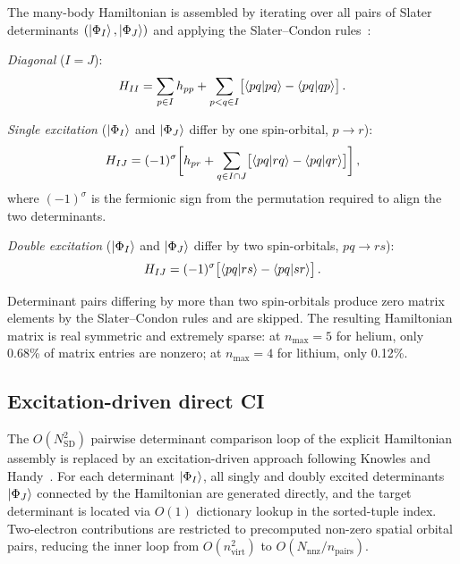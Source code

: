 \documentclass[aps,pra,twocolumn,superscriptaddress,longbibliography,floatfix]{revtex4-2}
\begin{document}
The many-body Hamiltonian is assembled by iterating over all pairs
of Slater determinants $(\ket{\Phi_I}, \ket{\Phi_J})$ and applying
the Slater--Condon rules~\cite{Szabo1996}:

\emph{Diagonal} ($I = J$):
\begin{equation}
H_{II} = \sum_{p \in I} h_{pp}
+ \sum_{p < q \in I} \bigl[\braket{pq|pq} - \braket{pq|qp}\bigr]\,.
\label{eq:sc_diag}
\end{equation}

\emph{Single excitation} ($\ket{\Phi_I}$ and $\ket{\Phi_J}$ differ
by one spin-orbital, $p \to r$):
\begin{equation}
H_{IJ} = (-1)^{\sigma} \biggl[ h_{pr}
+ \sum_{q \in I \cap J} \bigl[\braket{pq|rq} - \braket{pq|qr}\bigr]
\biggr]\,,
\label{eq:sc_single}
\end{equation}
where $(-1)^{\sigma}$ is the fermionic sign from the permutation
required to align the two determinants.

\emph{Double excitation} ($\ket{\Phi_I}$ and $\ket{\Phi_J}$ differ
by two spin-orbitals, $pq \to rs$):
\begin{equation}
H_{IJ} = (-1)^{\sigma}
\bigl[\braket{pq|rs} - \braket{pq|sr}\bigr]\,.
\label{eq:sc_double}
\end{equation}

Determinant pairs differing by more than two spin-orbitals produce
zero matrix elements by the Slater--Condon rules and are skipped.
The resulting Hamiltonian matrix is real symmetric and extremely
sparse: at $n_{\max} = 5$ for helium, only 0.68\% of matrix entries
are nonzero; at $n_{\max} = 4$ for lithium, only 0.12\%.

\subsection{Excitation-driven direct CI}
\label{sec:direct_ci}

The $O(N_{\text{SD}}^2)$ pairwise determinant comparison loop of the
explicit Hamiltonian assembly is replaced by an excitation-driven
approach following Knowles and Handy~\cite{Knowles1984}.
For each determinant $\ket{\Phi_I}$, all singly and doubly excited
determinants $\ket{\Phi_J}$ connected by the Hamiltonian are generated
directly, and the target determinant is located via $O(1)$ dictionary
lookup in the sorted-tuple index.
Two-electron contributions are restricted to precomputed non-zero
spatial orbital pairs, reducing the inner loop from $O(n_{\text{virt}}^2)$
to $O(N_{\text{nnz}}/n_{\text{pairs}})$.
\end{document}
